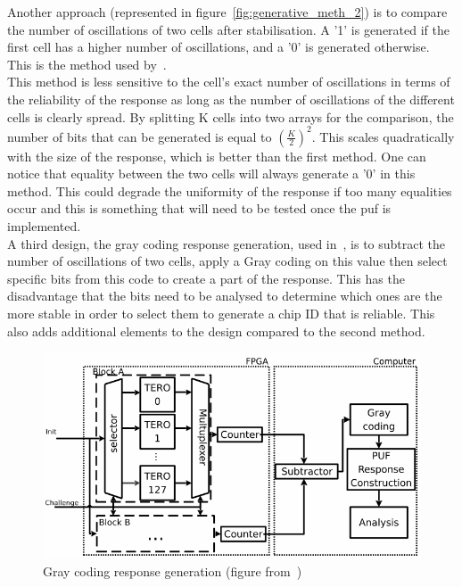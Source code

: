 Another approach (represented in figure~\ref{fig:generative_meth_2}) is to compare the number of oscillations of two cells after stabilisation. A '1' is generated if the first cell has a higher number of oscillations, and a '0' is generated otherwise. This is the method used by~\cite{de_weerdt_implementation_2021}.\\

This method is less sensitive to the cell's exact number of oscillations in terms of the reliability of the response as long as the number of oscillations of the different cells is clearly spread. By splitting K cells into two arrays for the comparison, the number of bits that can be generated is equal to $\left ( \frac{K}{2}\right )^2$. This scales quadratically with the size of the response, which is better than the first method. One can notice that equality between the two cells will always generate a '0' in this method. This could degrade the uniformity of the response if too many equalities occur and this is something that will need to be tested once the \acrshort{puf} is implemented.\\


A third design, the gray coding response generation, used in~\cite{marchand_implementation_2017}, is to subtract the number of oscillations of two cells, apply a Gray coding on this value then select specific bits from this code to create a part of the response. 
This has the disadvantage that the bits need to be analysed to determine which ones are the more stable in order to select them to generate a chip ID that is reliable. This also adds additional elements to the design compared to the second method.

\begin{figure}[H]
    \centering
    \includegraphics[width=0.75\linewidth]{images/tero_gray_coding.png}
    \caption{Gray coding response generation (figure from~\cite{marchand_implementation_2017})}
    \label{fig:generative_meth_3}
\end{figure}

